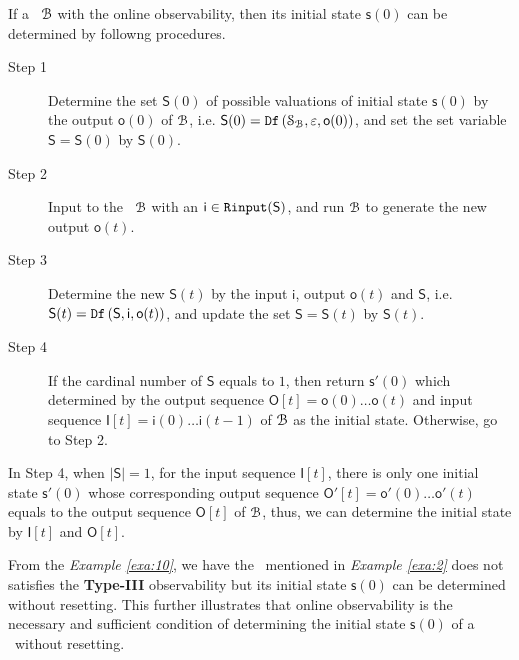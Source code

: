 

 If a \BCN\ ${\mathcal{B}}$ with the online observability, then its initial state $\mathsf{s}(0)$ can be determined by followng procedures.

\begin{description}
	\item[Step 1]  Determine the set $\mathsf{S}(0)$ of possible valuations of initial state $\mathsf{s}(0)$ by the output $\mathsf{o}(0)$ of ${\mathcal{B}}$, i.e. $\mathsf{S}(0)={\tt Df}\left(\mathcal{S}_{\mathcal{B}},\varepsilon,\mathsf{o}(0)\right)$, and set the set variable $\mathsf{S}=\mathsf{S}(0)$ by $\mathsf{S}(0)$.
	\item[Step 2] Input to the \BCN\ ${\mathcal{B}}$ with an $\mathsf{i}\in{\tt Rinput}(\mathsf{S})$, and run ${\mathcal{B}}$ to generate the new output $\mathsf{o}(t)$. 
	\item[Step 3] Determine the new $\mathsf{S}(t)$ by the input $\mathsf{i}$, output $\mathsf{o}(t)$ and $\mathsf{S}$, i.e. $\mathsf{S}(t)={\tt Df}\left(\mathsf{S},\mathsf{i},\mathsf{o}(t)\right)$, and update the set $\mathsf{S}=\mathsf{S}(t)$ by $\mathsf{S}(t)$.
	\item[Step 4] If the cardinal number of $\mathsf{S}$ equals to $1$, then return $\mathsf{s}'(0)$ which determined by the output sequence $\mathsf{O}[t]=\mathsf{o}(0)\ldots\mathsf{o}(t)$ and input sequence $\mathsf{I}[t]=\mathsf{i}(0)\ldots\mathsf{i}(t-1)$ of ${\mathcal{B}}$ as the initial state. %
	 Otherwise, go to Step 2.
\end{description}
  In Step 4, when $|\mathsf{S}|=1$, for the input sequence $\mathsf{I}[t]$, there is only one initial state $\mathsf{s}'(0)$ whose corresponding output sequence  $\mathsf{O}'[t]=\mathsf{o}'(0)\ldots\mathsf{o}'(t)$ equals to the output sequence $\mathsf{O}[t]$ of ${\mathcal{B}}$, thus, we can determine the initial state by $\mathsf{I}[t]$ and $\mathsf{O}[t]$. 

 From the {\em Example \ref{exa:10}}, we have the \BCN\ mentioned in {\em Example \ref{exa:2}} does not satisfies the {\bf Type-III} observability but its initial state $\mathsf{s}(0)$  can be determined without resetting. 
 This further illustrates that online observability is the necessary and sufficient condition of determining the initial state $\mathsf{s}(0)$ of a \BCN\  without  resetting.


